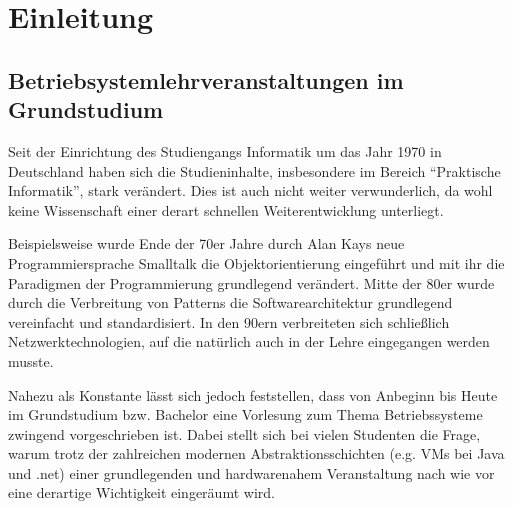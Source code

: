\chapter{Einleitung}
\label{chap:introduction}


\section{Betriebsystemlehrveranstaltungen im Grundstudium}
\label{sec:motivation}

		Seit der Einrichtung des Studiengangs Informatik um das Jahr 1970 in Deutschland haben sich die Studieninhalte, insbesondere im Bereich "`Praktische Informatik"', stark verändert.
		Dies ist auch nicht weiter verwunderlich, da wohl keine Wissenschaft einer derart schnellen Weiterentwicklung unterliegt.

		Beispielsweise wurde Ende der 70er Jahre durch Alan Kays neue Programmiersprache Smalltalk die Objektorientierung eingeführt und mit ihr die Paradigmen der Programmierung grundlegend verändert.
		Mitte der 80er wurde durch die Verbreitung von Patterns die Softwarearchitektur grundlegend vereinfacht und standardisiert.
		In den 90ern verbreiteten sich schließlich Netzwerktechnologien, auf die natürlich auch in der Lehre eingegangen werden musste.

		Nahezu als Konstante lässt sich jedoch feststellen, dass von Anbeginn bis Heute im Grundstudium bzw. Bachelor eine Vorlesung zum Thema Betriebssysteme zwingend vorgeschrieben ist.
		Dabei stellt sich bei vielen Studenten die Frage, warum trotz der zahlreichen modernen Abstraktionsschichten (e.g. VMs bei Java und .net) einer grundlegenden und hardwarenahem Veranstaltung nach wie vor eine derartige Wichtigkeit eingeräumt wird.


